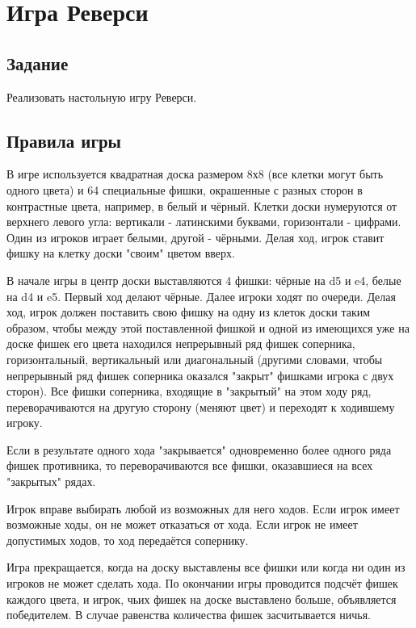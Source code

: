 \documentclass[a4paper]{article}
\begin{document}
\vfill %
\tableofcontents
\newpage

\section{Игра Реверси}
\subsection{Задание}
Реализовать настольную игру Реверси.

\subsection{Правила игры}
В игре используется квадратная доска размером 8х8 (все клетки могут быть одного цвета) и 64 специальные фишки, окрашенные с разных сторон в контрастные цвета, например, в белый и чёрный. Клетки доски нумеруются от верхнего левого угла: вертикали - латинскими буквами, горизонтали - цифрами. Один из игроков играет белыми, другой - чёрными. Делая ход, игрок ставит фишку на клетку доски "своим" цветом вверх.

В начале игры в центр доски выставляются 4 фишки: чёрные на d5 и e4, белые на d4 и e5. Первый ход делают чёрные. Далее игроки ходят по очереди.
Делая ход, игрок должен поставить свою фишку на одну из клеток доски таким образом, чтобы между этой поставленной фишкой и одной из имеющихся уже на доске фишек его цвета находился непрерывный ряд фишек соперника, горизонтальный, вертикальный или диагональный (другими словами, чтобы непрерывный ряд фишек соперника оказался "закрыт" фишками игрока с двух сторон). Все фишки соперника, входящие в "закрытый" на этом ходу ряд, переворачиваются на другую сторону (меняют цвет) и переходят к ходившему игроку.

Если в результате одного хода "закрывается" одновременно более одного ряда фишек противника, то переворачиваются все фишки, оказавшиеся на всех "закрытых" рядах.

Игрок вправе выбирать любой из возможных для него ходов. Если игрок имеет возможные ходы, он не может отказаться от хода. Если игрок не имеет допустимых ходов, то ход передаётся сопернику.

Игра прекращается, когда на доску выставлены все фишки или когда ни один из игроков не может сделать хода. По окончании игры проводится подсчёт фишек каждого цвета, и игрок, чьих фишек на доске выставлено больше, объявляется победителем. В случае равенства количества фишек засчитывается ничья.
\end{document}
